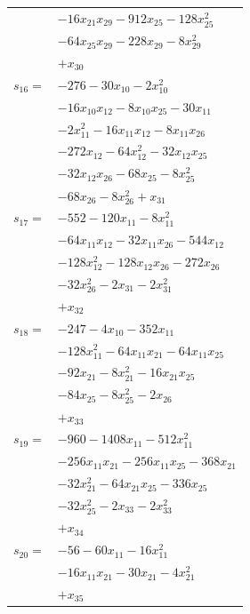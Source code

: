 \begin{longtable}{@{}r@{\;}l@{}}
 & \(\displaystyle -16x_{21}x_{29} -912x_{25} -128x_{25}^{2}\) \\
 & \(\displaystyle -64x_{25}x_{29} -228x_{29} -8x_{29}^{2}\) \\
 & \(\displaystyle +x_{30}\) \\[3pt]
\(s_{16}=\) & \(\displaystyle -276 -30x_{10} -2x_{10}^{2}\) \\
 & \(\displaystyle -16x_{10}x_{12} -8x_{10}x_{25} -30x_{11}\) \\
 & \(\displaystyle -2x_{11}^{2} -16x_{11}x_{12} -8x_{11}x_{26}\) \\
 & \(\displaystyle -272x_{12} -64x_{12}^{2} -32x_{12}x_{25}\) \\
 & \(\displaystyle -32x_{12}x_{26} -68x_{25} -8x_{25}^{2}\) \\
 & \(\displaystyle -68x_{26} -8x_{26}^{2} +x_{31}\) \\[3pt]
\(s_{17}=\) & \(\displaystyle -552 -120x_{11} -8x_{11}^{2}\) \\
 & \(\displaystyle -64x_{11}x_{12} -32x_{11}x_{26} -544x_{12}\) \\
 & \(\displaystyle -128x_{12}^{2} -128x_{12}x_{26} -272x_{26}\) \\
 & \(\displaystyle -32x_{26}^{2} -2x_{31} -2x_{31}^{2}\) \\
 & \(\displaystyle +x_{32}\) \\[3pt]
\(s_{18}=\) & \(\displaystyle -247 -4x_{10} -352x_{11}\) \\
 & \(\displaystyle -128x_{11}^{2} -64x_{11}x_{21} -64x_{11}x_{25}\) \\
 & \(\displaystyle -92x_{21} -8x_{21}^{2} -16x_{21}x_{25}\) \\
 & \(\displaystyle -84x_{25} -8x_{25}^{2} -2x_{26}\) \\
 & \(\displaystyle +x_{33}\) \\[3pt]
\(s_{19}=\) & \(\displaystyle -960 -1408x_{11} -512x_{11}^{2}\) \\
 & \(\displaystyle -256x_{11}x_{21} -256x_{11}x_{25} -368x_{21}\) \\
 & \(\displaystyle -32x_{21}^{2} -64x_{21}x_{25} -336x_{25}\) \\
 & \(\displaystyle -32x_{25}^{2} -2x_{33} -2x_{33}^{2}\) \\
 & \(\displaystyle +x_{34}\) \\[3pt]
\(s_{20}=\) & \(\displaystyle -56 -60x_{11} -16x_{11}^{2}\) \\
 & \(\displaystyle -16x_{11}x_{21} -30x_{21} -4x_{21}^{2}\) \\
 & \(\displaystyle +x_{35}\) \\[3pt]

\end{longtable}
